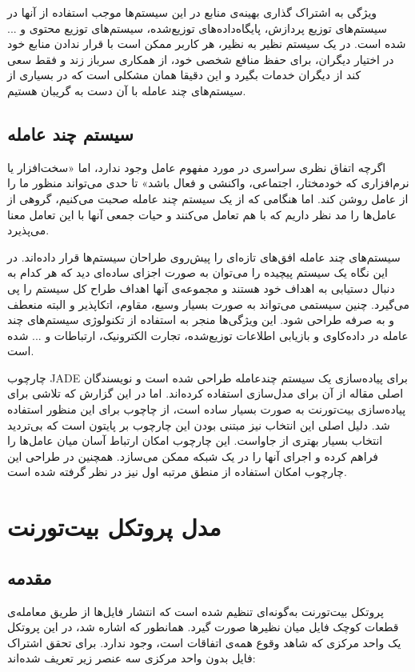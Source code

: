 \documentclass{report}
\begin{document}
ویژگی به اشتراک گذاری بهینه‌ی منابع در این سیستم‌ها موجب استفاده از آنها در سیستم‌های توزیع پردازش، پایگاه‌داده‌های توزیع‌شده، سیستم‌های توزیع محتوی و ... شده است. در یک سیستم نظیر به نظیر، هر کاربر ممکن است با قرار ندادن منابع خود در اختیار دیگران، برای حفظ منافع شخصی خود، از همکاری سرباز زند و فقط سعی کند از دیگران خدمات بگیرد و این دقیقا همان مشکلی است که در بسیاری از سیستم‌های چند عامله با آن دست به گریبان هستیم.  

\subsection{سیستم چند عامله}
اگرچه اتفاق نظری سراسری در مورد مفهوم عامل وجود ندارد، اما «سخت‌افزار یا نرم‌افزاری که خودمختار، اجتماعی، واکنشی و فعال باشد»\cite{wooldridge} تا حدی می‌تواند منظور ما را از عامل روشن کند. اما هنگامی که از یک سیستم چند عامله صحبت می‌کنیم، گروهی از عامل‌ها را مد نظر داریم که با هم تعامل می‌کنند و حیات جمعی آنها با این تعامل معنا می‌پذیرد.

سیستم‌های چند عامله افق‌های تازه‌ای را پیش‌روی طراحان سیستم‌ها قرار داده‌اند. در این نگاه یک سیستم پیچیده را می‌توان به صورت اجزای ساده‌ای دید که هر کدام به دنبال دستیابی به اهداف خود هستند و مجموعه‌ی آنها اهداف طراح کل سیستم را پی می‌گیرد. چنین سیستمی می‌تواند به صورت بسیار وسیع، مقاوم، اتکاپذیر و البته منعطف و به صرفه طراحی شود. این ویژگی‌ها منجر به استفاده از تکنولوژی سیستم‌های چند عامله در داده‌کاوی و بازیابی اطلاعات توزیع‌شده، تجارت الکترونیک، ارتباطات و ... شده است.

چارچوب JADE برای پیاده‌سازی یک سیستم چندعامله طراحی شده است و نویسندگان اصلی مقاله از آن برای مدل‌سازی استفاده کرده‌اند. اما در این گزارش که تلاشی برای پیاده‌سازی بیت‌تورنت به صورت بسیار ساده است، از چاچوب  برای این منظور استفاده شد. دلیل اصلی این انتخاب نیز مبتنی بودن این چارچوب بر پایتون است که بی‌تردید انتخاب بسیار بهتری از جاواست. این چارچوب امکان ارتباط آسان میان عامل‌ها را فراهم کرده و اجرای آنها را در یک شبکه ممکن می‌سازد. همچنین در طراحی این چارچوب امکان استفاده از منطق مرتبه اول نیز در نظر گرفته شده است.

\section{مدل پروتکل بیت‌تورنت}

\subsection{مقدمه}
پروتکل بیت‌تورنت به‌گونه‌ای تنظیم شده است که انتشار فایل‌ها از طریق معامله‌ی قطعات کوچک فایل میان نظیرها صورت گیرد. همانطور که اشاره شد، در این پروتکل یک واحد مرکزی که شاهد وقوع همه‌ی اتفاقات است، وجود ندارد. برای تحقق اشتراک فایل بدون واحد مرکزی سه عنصر زیر تعریف شده‌اند:
\end{document}
